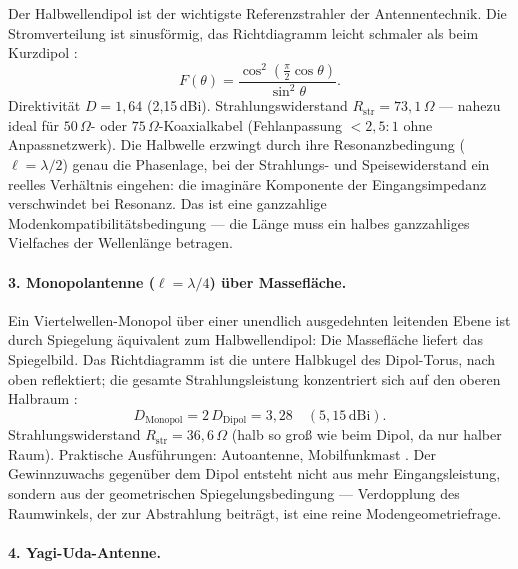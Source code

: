 Der Halbwellendipol ist der wichtigste Referenzstrahler der Antennentechnik.
Die Stromverteilung ist sinusförmig, das Richtdiagramm leicht schmaler als
beim Kurzdipol \EM:
\[
  F(\theta) = \frac{\cos^2\!\left(\frac{\pi}{2}\cos\theta\right)}{\sin^2\theta}.
\]
Direktivität $D = 1{,}64$ (2,15\,dBi). Strahlungswiderstand
$R_\mathrm{str} = 73{,}1\,\Omega$ --- nahezu ideal für $50\,\Omega$- oder
$75\,\Omega$-Koaxialkabel (Fehlanpassung $< 2{,}5:1$ ohne Anpassnetzwerk).
Die Halbwelle erzwingt durch ihre Resonanzbedingung ($\ell = \lambda/2$)
genau die Phasenlage, bei der Strahlungs- und Speisewiderstand ein reelles
Verhältnis eingehen: die imaginäre Komponente der Eingangsimpedanz
verschwindet bei Resonanz. Das ist eine ganzzahlige Modenkompatibilitätsbedingung
--- die Länge muss ein halbes ganzzahliges Vielfaches der Wellenlänge betragen.

\paragraph{3. Monopolantenne ($\ell = \lambda/4$) über Massefläche.}

Ein Viertelwellen-Monopol über einer unendlich ausgedehnten leitenden Ebene
ist durch Spiegelung äquivalent zum Halbwellendipol: Die Massefläche liefert
das Spiegelbild. Das Richtdiagramm ist die untere Halbkugel des Dipol-Torus,
nach oben reflektiert; die gesamte Strahlungsleistung konzentriert sich auf
den oberen Halbraum \EM:
\[
  D_\mathrm{Monopol} = 2\,D_\mathrm{Dipol} = 3{,}28 \quad (5{,}15\,\mathrm{dBi}).
\]
Strahlungswiderstand $R_\mathrm{str} = 36{,}6\,\Omega$ (halb so groß wie beim
Dipol, da nur halber Raum). Praktische Ausführungen: Autoantenne, Mobilfunkmast \cite{Balanis2016}.
Der Gewinnzuwachs gegenüber dem Dipol entsteht nicht aus mehr Eingangsleistung,
sondern aus der geometrischen Spiegelungsbedingung --- Verdopplung des Raumwinkels,
der zur Abstrahlung beiträgt, ist eine reine Modengeometriefrage.

\paragraph{4. Yagi-Uda-Antenne.}

